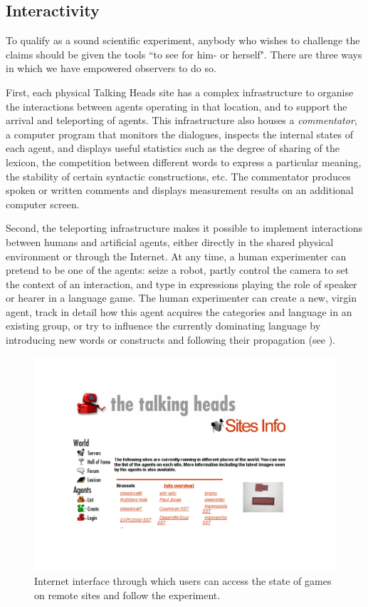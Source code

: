 \subsection{Interactivity}

To qualify as a sound scientific experiment, anybody 
who wishes to challenge the claims should be given 
the tools ``to see for him- or herself". There are three 
ways in which we have empowered observers to do so. 

First, each physical Talking Heads site has 
a complex infrastructure to organise the interactions between
agents operating in that location, and to support the
arrival and teleporting of agents. This infrastructure also houses
a {\itshape commentator}, a computer program that
monitors the dialogues, inspects the internal states of each
agent, and displays useful statistics such as the degree
of sharing of the lexicon, the competition between different
words to express a particular meaning, the stability of 
certain syntactic constructions, etc. The commentator 
produces spoken or written comments and displays
measurement results on an additional computer screen. 

Second, the teleporting infrastructure makes it possible 
to implement interactions between humans and artificial agents, 
either directly in the shared physical environment or 
through the Internet. At any time, a human experimenter can
pretend to be one of the agents: seize 
a robot, partly control the
camera to set the context of an interaction, and type 
in expressions playing the role of speaker or hearer in 
a language game. The human experimenter can create a 
new, virgin agent, track in detail how this agent acquires the 
categories and language in an existing group, 
or try to influence the currently dominating language
by introducing new words or constructs and following
their propagation (see ). 


\begin{figure}[htbp]
  \centerline{\includegraphics[width=.80\textwidth]{chap2/figs/interface}}
\caption{ Internet interface through which users can 
access the state of games on remote sites and 
follow the experiment.}
\label{f:plate8}
\end{figure}

